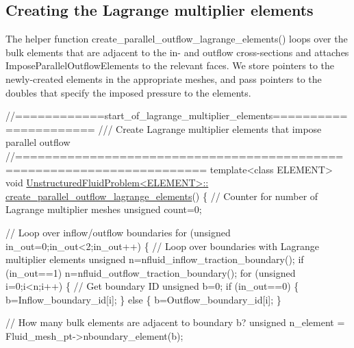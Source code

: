 \hypertarget{index_lagr}{}\subsection{Creating the Lagrange multiplier elements}\label{index_lagr}
The helper function {\ttfamily create\+\_\+parallel\+\_\+outflow\+\_\+lagrange\+\_\+elements()} loops over the bulk elements that are adjacent to the in-\/ and outflow cross-\/sections and attaches {\ttfamily Impose\+Parallel\+Outflow\+Elements} to the relevant faces. We store pointers to the newly-\/created elements in the appropriate meshes, and pass pointers to the doubles that specify the imposed pressure to the elements.


\begin{DoxyCodeInclude}
\textcolor{comment}{//============start\_of\_lagrange\_multiplier\_elements======================}
\textcolor{comment}{/// Create Lagrange multiplier elements that impose parallel outflow}
\textcolor{comment}{}\textcolor{comment}{//=======================================================================}
\textcolor{keyword}{template}<\textcolor{keyword}{class} ELEMENT>
\textcolor{keywordtype}{void} \hyperlink{classUnstructuredFluidProblem_aea2fa32b4dd90aab81da540566b9925a}{UnstructuredFluidProblem<ELEMENT>::}
\hyperlink{classUnstructuredFluidProblem_aea2fa32b4dd90aab81da540566b9925a}{create\_parallel\_outflow\_lagrange\_elements}()
\{
 \textcolor{comment}{// Counter for number of Lagrange multiplier meshes}
 \textcolor{keywordtype}{unsigned} count=0;

 \textcolor{comment}{// Loop over inflow/outflow boundaries}
 \textcolor{keywordflow}{for} (\textcolor{keywordtype}{unsigned} in\_out=0;in\_out<2;in\_out++)
  \{
   \textcolor{comment}{// Loop over boundaries with Lagrange multiplier elements}
   \textcolor{keywordtype}{unsigned} n=nfluid\_inflow\_traction\_boundary();
   \textcolor{keywordflow}{if} (in\_out==1) n=nfluid\_outflow\_traction\_boundary();
   \textcolor{keywordflow}{for} (\textcolor{keywordtype}{unsigned} i=0;i<n;i++)
    \{
     \textcolor{comment}{// Get boundary ID}
     \textcolor{keywordtype}{unsigned} b=0;
     \textcolor{keywordflow}{if} (in\_out==0)
      \{
       b=Inflow\_boundary\_id[i];
      \}
     \textcolor{keywordflow}{else}
      \{
       b=Outflow\_boundary\_id[i];
      \}
     
     \textcolor{comment}{// How many bulk elements are adjacent to boundary b?}
     \textcolor{keywordtype}{unsigned} n\_element = Fluid\_mesh\_pt->nboundary\_element(b);
     

\end{DoxyCodeInclude}
